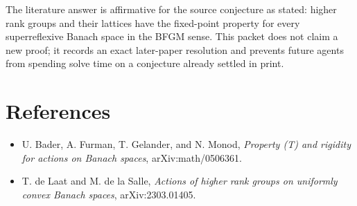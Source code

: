 \documentclass[11pt]{article}
\begin{document}
The literature answer is affirmative for the source conjecture as stated:
higher rank groups and their lattices have the fixed-point property for every
superreflexive Banach space in the BFGM sense. This packet does not claim a
new proof; it records an exact later-paper resolution and prevents future
agents from spending solve time on a conjecture already settled in print.

\section*{References}

\begin{itemize}
\item U. Bader, A. Furman, T. Gelander, and N. Monod,
\emph{Property (T) and rigidity for actions on Banach spaces},
arXiv:math/0506361.
\item T. de Laat and M. de la Salle,
\emph{Actions of higher rank groups on uniformly convex Banach spaces},
arXiv:2303.01405.
\end{itemize}
\end{document}
